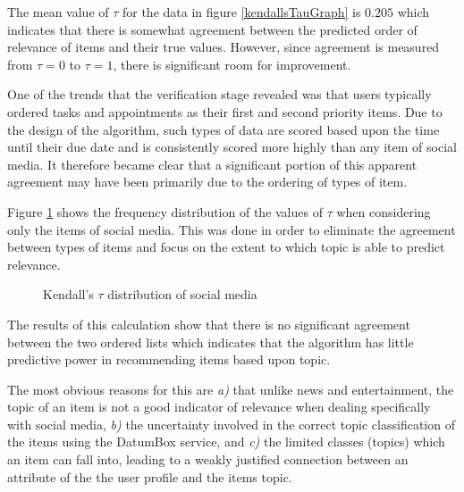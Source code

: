 The mean value of $\tau$ for the data in figure \ref{kendallsTauGraph} is $0.205$ which indicates that there is somewhat agreement between the predicted order of relevance of items and their true values. However, since agreement is measured from $\tau = 0$ to $\tau = 1$, there is significant room for improvement. 

One of the trends that the verification stage revealed was that users typically ordered tasks and appointments as their first and second priority items. Due to the design of the algorithm, such types of data are scored based upon the time until their due date and is consistently scored more highly than any item of social media. It therefore became clear that a significant portion of this apparent agreement may have been primarily due to the ordering of types of item.

Figure \ref{kendallsTauGraph2} shows the frequency distribution of the values of $\tau$ when considering only the items of social media. This was done in order to eliminate the agreement between types of items and focus on the extent to which topic is able to predict relevance. 

\begin{figure}[ht!]
    \caption{Kendall's $\tau$ distribution of social media}
    \label{kendallsTauGraph2}
\end{figure}

The results of this calculation show that there is no significant agreement between the two ordered lists which indicates that the algorithm has little predictive power in recommending items based upon topic. 

The most obvious reasons for this are \emph{a)} that unlike news and entertainment, the topic of an item is not a good indicator of relevance when dealing specifically with social media, \emph{b)} the uncertainty involved in the correct topic classification of the items using the DatumBox service, and \emph{c)} the limited classes (topics) which an item can fall into, leading to a weakly justified connection between an attribute of the the user profile and the items topic.

